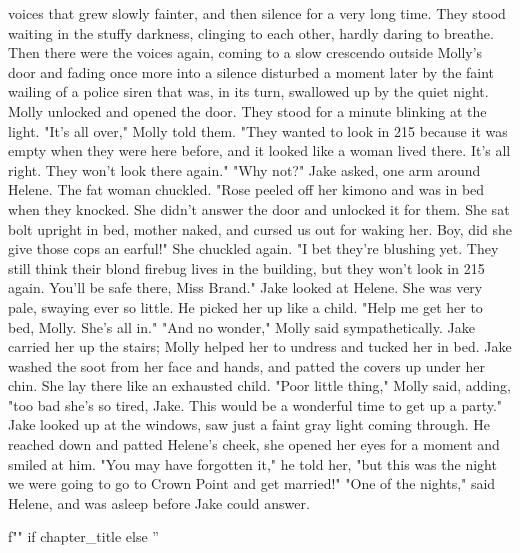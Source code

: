\documentclass{novel}
\begin{document}
voices that grew slowly fainter, and then silence for a very long time. They stood waiting in the stuffy darkness, clinging to each other, hardly daring to breathe. Then there were the voices again, coming to a slow crescendo outside Molly’s door and fading once more into a silence disturbed a moment later by the faint wailing of a police siren that was, in its turn, swallowed up by the quiet night. Molly unlocked and opened the door. They stood for a minute blinking at the light. "It’s all over," Molly told them. "They wanted to look in 215 because it was empty when they were here before, and it looked like a woman lived there. It’s all right. They won’t look there again." "Why not?" Jake asked, one arm around Helene. The fat woman chuckled. "Rose peeled off her kimono and was in bed when they knocked. She didn’t answer the door and unlocked it for them. She sat bolt upright in bed, mother naked, and cursed us out for waking her. Boy, did she give those cops an earful!" She chuckled again. "I bet they’re blushing yet. They still think their blond firebug lives in the building, but they won’t look in 215 again. You’ll be safe there, Miss Brand." Jake looked at Helene. She was very pale, swaying ever so little. He picked her up like a child. "Help me get her to bed, Molly. She’s all in." "And no wonder," Molly said sympathetically. Jake carried her up the stairs; Molly helped her to undress and tucked her in bed. Jake washed the soot from her face and hands, and patted the covers up under her chin. She lay there like an exhausted child. "Poor little thing," Molly said, adding, "too bad she’s so tired, Jake. This would be a wonderful time to get up a party." Jake looked up at the windows, saw just a faint gray light coming through. He reached down and patted Helene’s cheek, she opened her eyes for a moment and smiled at him. "You may have forgotten it," he told her, "but this was the night we were going to go to Crown Point and get married!" "One of the nights," said Helene, and was asleep before Jake could answer.

\begin{ChapterStart}
\vspace{3\nbs}
f"" if chapter_title else ''
\end{ChapterStart}
\end{document}
